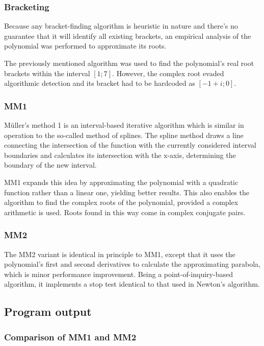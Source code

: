 \documentclass{article}
\begin{document}
	\subsubsection{Bracketing}
	
	Because any bracket-finding algorithm is heuristic in nature and there's no
	guarantee that it will identify all existing brackets, an empirical analysis
	of the polynomial was performed to approximate its roots.
	
	The previously mentioned algorithm was used to find the polynomial's real
	root brackets within the interval $[1; 7]$. However, the complex root evaded
	algorithmic detection and its bracket had to be hardcoded as $[-1 + i; 0]$.
	
	\subsubsection{MM1}
	
	M{\"u}ller's method 1 is an interval-based iterative algorithm which is
	similar in operation to the so-called method of splines. The spline method
	draws a line connecting the intersection of the function with the currently
	considered interval boundaries and calculates its intersection with the
	x-axis, determining the boundary of the new interval.
	
	MM1 expands this idea by approximating the polynomial with a quadratic
	function rather than a linear one, yielding better results. This also
	enables the algorithm to find the complex roots of the polynomial, provided
	a complex arithmetic is used. Roots found in this way come in complex
	conjugate pairs.
	
	\subsubsection{MM2}
	
	The MM2 variant is identical in principle to MM1, except that it uses the
	polynomial's first and second derivatives to calculate the approximating
	parabola, which is minor performance improvement. Being a
	point-of-inquiry-based algorithm, it implements a stop test identical to
	that used in Newton's algorithm.
	
	\subsection{Program output}
	
	\subsubsection{Comparison of MM1 and MM2}
	
\end{document}
